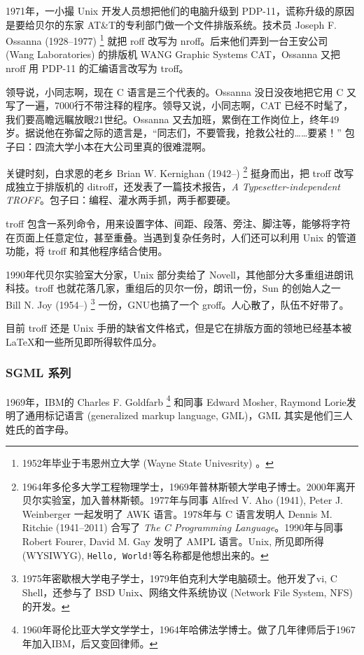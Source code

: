 1971年，一小撮 Unix 开发人员想把他们的电脑升级到 PDP-11，谎称升级的原因是要给贝尔的东家 AT\&T\indexATT 的专利部门做一个文件排版系统。技术员 Joseph F. Ossanna (1928--1977)\indexOssanna{} \footnote{1952年毕业于韦恩州立大学 (Wayne State Univesrity) 。} 就把 roff 改写为 nroff。后来他们弄到一台王安公司 (Wang Laboratories)\indexWangLabs{} 的排版机 WANG Graphic Systems CAT，Ossanna 又把 nroff 用 PDP-11 的汇编语言改写为 troff。

领导说，小同志啊，现在 C 语言是三个代表的。Ossanna 没日没夜地把它用 C 又写了一遍，7000行不带注释的程序。领导又说，小同志啊，CAT 已经不时髦了，我们要高瞻远瞩放眼21世纪。Ossanna 又去加班，累倒在工作岗位上，终年49岁。据说他在弥留之际的遗言是，“同志们，不要管我，抢救公社的……要紧！” 包子曰：四流大学小本在大公司里真的很难混啊。

关键时刻，白求恩的老乡 Brian W. Kernighan (1942--)\indexKernighan{} \footnote{1964年多伦多大学工程物理学士，1969年普林斯顿大学电子博士。2000年离开贝尔实验室，加入普林斯顿。1977年与同事 Alfred V. Aho (1941), Peter J. Weinberger 一起发明了 AWK 语言。1978年与 C 语言发明人 Dennis M. Ritchie (1941--2011) 合写了 \emph{The C Programming Language}。1990年与同事 Robert Fourer, David M. Gay 发明了 AMPL 语言。Unix, 所见即所得 (WYSIWYG), \texttt{Hello, World!}等名称都是他想出来的。} 挺身而出，把 troff 改写成独立于排版机的 ditroff，还发表了一篇技术报告，\emph{A Typesetter-independent TROFF}。包子曰：编程、灌水两手抓，两手都要硬。

troff 包含一系列命令，用来设置字体、间距、段落、旁注、脚注等，能够将字符在页面上任意定位，甚至重叠。当遇到复杂任务时，人们还可以利用 Unix 的管道功能，将 troff 和其他程序结合使用。

1990年代贝尔实验室大分家，Unix 部分卖给了 Novell，其他部分大多重组进朗讯科技\indexLucent{}。troff 也就花落几家，重组后的贝尔一份，朗讯一份，Sun 的创始人之一 Bill N. Joy (1954--)\indexJoy{} \footnote{1975年密歇根大学电子学士，1979年伯克利大学电脑硕士。他开发了vi, C Shell，还参与了 BSD Unix、网络文件系统协议 (Network File System, NFS) 的开发。} 一份，GNU\indexGNU 也搞了一个 groff。人心散了，队伍不好带了。

目前 troff 还是 Unix 手册的缺省文件格式，但是它在排版方面的领地已经基本被 \LaTeX 和一些所见即所得软件瓜分。

\subsubsection{SGML 系列}

1969年，IBM\indexIBM 的 Charles F. Goldfarb\indexGoldfarb{} \footnote{1960年哥伦比亚大学文学学士，1964年哈佛法学博士。做了几年律师后于1967年加入IBM，后又变回律师。} 和同事 Edward Mosher\indexMosher , Raymond Lorie\indexLorie 发明了通用标记语言 (generalized markup language, GML)，GML 其实是他们三人姓氏的首字母。

